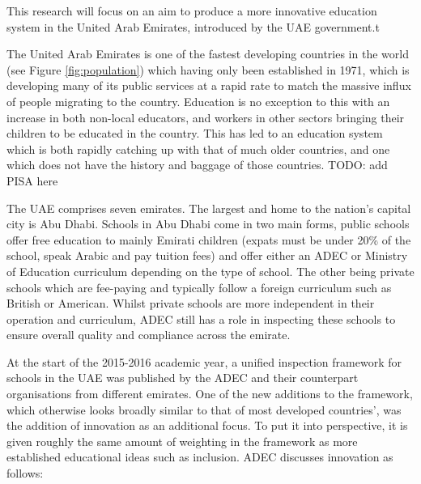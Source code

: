 This research will focus on an aim to produce a more innovative education system in the United Arab Emirates, introduced by the UAE government.t

The United Arab Emirates is one of the fastest developing countries in the world (see Figure \ref{fig:population}) which having only been established in 1971, which is developing many of its public services at a rapid rate to match the massive influx of people migrating to the country. Education is no exception to this with an increase in both non-local educators, and workers in other sectors bringing their children to be educated in the country. This has led to an education system which is both rapidly catching up with that of much older countries, and one which does not have the history and baggage of those countries. TODO: add PISA here

The UAE comprises seven emirates. The largest and home to the nation's capital city is Abu Dhabi. Schools in Abu Dhabi come in two main forms, public schools offer free education to mainly Emirati children (expats must be under 20\% of the school, speak Arabic and pay tuition fees) and offer either an ADEC or Ministry of Education curriculum depending on the type of school. The other being private schools which are fee-paying and typically follow a foreign curriculum such as British or American. Whilst private schools are more independent in their operation and curriculum, ADEC still has a role in inspecting these schools to ensure overall quality and compliance across the emirate.

At the start of the 2015-2016 academic year, a unified inspection framework for schools in the UAE was published by the ADEC and their counterpart organisations from different emirates. One of the new additions to the framework, which otherwise looks broadly similar to that of most developed countries', was the addition of innovation as an additional focus. To put it into perspective, it is given roughly the same amount of weighting in the framework as more established educational ideas such as inclusion. ADEC discusses innovation as follows:

